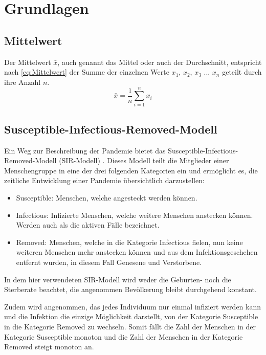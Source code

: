\chapter{Grundlagen}\label{chap:Grundlagen}

\section{Mittelwert}\label{sec:Grundlagen:Mittelwert}
Der Mittelwert $\bar x$, auch genannt das Mittel oder auch der Durchschnitt, entspricht nach \autoref{eq:Mittelwert} der Summe der einzelnen Werte $x_1$, $x_2$, $x_3$ ... $x_n$ geteilt durch ihre Anzahl $n$.
\begin{equation}\label{eq:Mittelwert}
    \bar x = \frac{1}{n}\sum_{i=1}^n x_i
\end{equation}

\section{Susceptible-Infectious-Removed-Modell}\label{sec:Grundlagen:SIR}
Ein Weg zur Beschreibung der Pandemie bietet das \glqq{}Susceptible-Infectious-Removed-Modell\grqq{} (SIR-Modell) \autocite{SIR}. Dieses Modell teilt die Mitglieder einer Menschengruppe in eine der drei folgenden Kategorien ein und ermöglicht es, die zeitliche Entwicklung einer Pandemie übersichtlich darzustellen:
\begin{itemize}
    \item \glqq{}Susceptible\grqq{}: Menschen, welche angesteckt werden können.
    \item \glqq{}Infectious\grqq{}: Infizierte Menschen, welche weitere Menschen anstecken können. Werden auch als \glqq{}die aktiven Fälle\grqq{} bezeichnet.
    \item \glqq{}Removed\grqq{}: Menschen, welche in die Kategorie \glqq{}Infectious\grqq{} fielen, nun keine weiteren Menschen mehr anstecken können und aus dem Infektionsgeschehen entfernt wurden,
    in diesem Fall Genesene und Verstorbene. 
\end{itemize}
In dem hier verwendeten SIR-Modell wird weder die Geburten- noch die Sterberate beachtet, die angenommen Bevölkerung bleibt durchgehend konstant.

Zudem wird angenommen, das jedes Individuum nur einmal infiziert werden kann und die Infektion die einzige Möglichkeit darstellt, von der Kategorie \glqq{}Susceptible\grqq{} in die Kategorie \glqq{}Removed\grqq{} zu wechseln.
Somit fällt die Zahl der Menschen in der Kategorie \glqq{}Susceptible\grqq{} monoton und die Zahl der Menschen in der Kategorie \glqq{}Removed\grqq{} steigt monoton an.\autocite{SIR}

